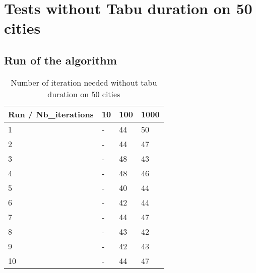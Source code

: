 \documentclass[12pt,oneside,a4paper]{article}
\begin{document}
\section{Tests without Tabu duration on 50 cities}
\subsection{Run of the algorithm}
\begin{table}[h]
    \centering
    \small
    \begin{tabular}{llll}
      \hline
      \multicolumn{1}{|l|}{\textbf{Run / Nb\_iterations}}& \multicolumn{1}{l|}{\textbf{10}} & \multicolumn{1}{l|}{\textbf{100}} & \multicolumn{1}{l|}{\textbf{1000}}\\ \hline
      \multicolumn{1}{|l|}{1} & \multicolumn{1}{l|}{-}  & \multicolumn{1}{l|}{44}  & \multicolumn{1}{l|}{50}  \\ \hline
      \multicolumn{1}{|l|}{2} & \multicolumn{1}{l|}{-}  & \multicolumn{1}{l|}{44}  & \multicolumn{1}{l|}{47}  \\ \hline         
      \multicolumn{1}{|l|}{3} & \multicolumn{1}{l|}{-}  & \multicolumn{1}{l|}{48}  & \multicolumn{1}{l|}{43}  \\ \hline
      \multicolumn{1}{|l|}{4} & \multicolumn{1}{l|}{-}  & \multicolumn{1}{l|}{48}  & \multicolumn{1}{l|}{46}  \\ \hline
      \multicolumn{1}{|l|}{5} & \multicolumn{1}{l|}{-}  & \multicolumn{1}{l|}{40}  & \multicolumn{1}{l|}{44}  \\ \hline
      \multicolumn{1}{|l|}{6} & \multicolumn{1}{l|}{-}  & \multicolumn{1}{l|}{42}  & \multicolumn{1}{l|}{44}  \\ \hline
      \multicolumn{1}{|l|}{7} & \multicolumn{1}{l|}{-}  & \multicolumn{1}{l|}{44}  & \multicolumn{1}{l|}{47}  \\ \hline
      \multicolumn{1}{|l|}{8} & \multicolumn{1}{l|}{-}  & \multicolumn{1}{l|}{43}  & \multicolumn{1}{l|}{42}  \\ \hline
      \multicolumn{1}{|l|}{9} & \multicolumn{1}{l|}{-}  & \multicolumn{1}{l|}{42}  & \multicolumn{1}{l|}{43}  \\ \hline
      \multicolumn{1}{|l|}{10} & \multicolumn{1}{l|}{-}  & \multicolumn{1}{l|}{44}  & \multicolumn{1}{l|}{47}  \\ \hline
    \end{tabular}
    \caption{Number of iteration needed without tabu duration on 50 cities}
    \label{Performances scénario 0}
  \end{table}
\end{document}
